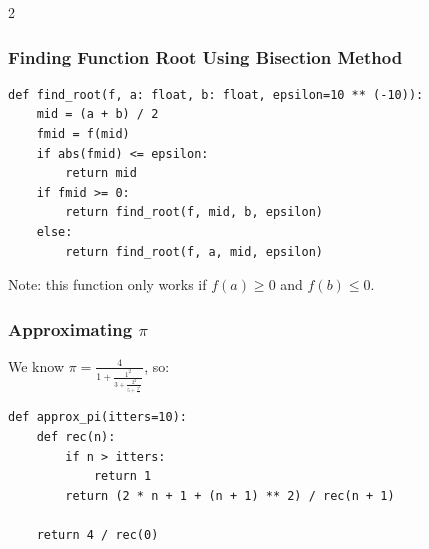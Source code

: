 \documentclass[]{article}
\begin{document}
\begin{multicols}{2}
		\subsubsection{Finding Function Root Using Bisection Method}
		\begin{lstlisting}
def find_root(f, a: float, b: float, epsilon=10 ** (-10)):
    mid = (a + b) / 2
    fmid = f(mid)
    if abs(fmid) <= epsilon:
        return mid
    if fmid >= 0:
        return find_root(f, mid, b, epsilon)
    else:
        return find_root(f, a, mid, epsilon)
        \end{lstlisting}
		Note: this function only works if $f(a)\ge 0$ and $f(b)\le 0$.
		\subsubsection{Approximating $\pi$}
		We know $\pi = \frac{4}{1+\frac{1^2}{3+\frac{2^2}{5+\frac{3^2}{\dots}}}}$, so:
		\begin{lstlisting}
def approx_pi(itters=10):
    def rec(n):
        if n > itters:
            return 1
        return (2 * n + 1 + (n + 1) ** 2) / rec(n + 1)

    return 4 / rec(0)
        \end{lstlisting}
	\end{multicols}
	
	
\end{document}
